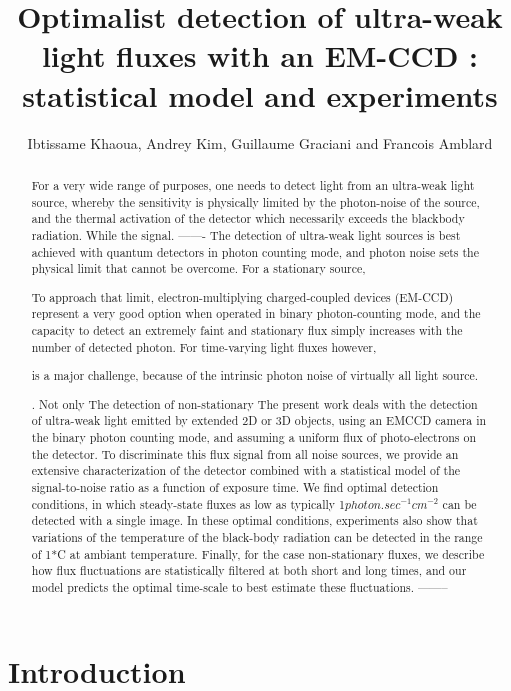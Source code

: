 \documentclass{article}
\title{Optimalist detection of ultra-weak light fluxes with an EM-CCD : statistical model and experiments}
\author{Ibtissame Khaoua, Andrey Kim, Guillaume Graciani and Francois Amblard }
\begin{document}
\maketitle

\begin{abstract}
For a very wide range of purposes, one needs to detect light from an ultra-weak light source, whereby the sensitivity is physically limited by the photon-noise of the source, and the thermal activation of the detector which necessarily exceeds the blackbody radiation.
While the signal.
-------
The detection of ultra-weak light sources is best achieved with quantum detectors in photon counting mode, and photon noise sets the physical limit that cannot be overcome. 
For a stationary source, 

To approach that limit, electron-multiplying charged-coupled devices (EM-CCD) represent a very good option when operated in binary photon-counting mode, and the capacity to detect an extremely faint and stationary flux simply increases with the number of detected photon.  
For time-varying light fluxes however, 

is a major challenge, because of the intrinsic photon noise of virtually all light source.  

. Not only  
The detection of non-stationary The present work deals with the detection of ultra-weak light emitted by extended 2D or 3D objects, using an EMCCD camera in the binary photon counting mode, and assuming a uniform flux of photo-electrons on the detector.
To discriminate this flux signal from all noise sources, we provide an extensive characterization of the detector combined with a statistical model of the signal-to-noise ratio as a function of exposure time.
We find optimal detection conditions, in which steady-state fluxes as low as typically 1$photon.sec^{-1} cm^{-2}$ can be detected with a single image.
In these optimal conditions, experiments also show that variations of the temperature of the black-body radiation can be detected in the range of 1*C at ambiant temperature.
Finally, for the case non-stationary fluxes, we describe how flux fluctuations are statistically filtered at both short and long times, and our model predicts the optimal time-scale to best estimate these fluctuations.
--------
\end{abstract}


\section*{Introduction}
\end{document}
